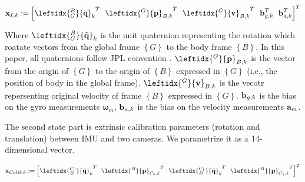 \documentclass[a4paper, 10pt, conference]{ieeeconf}      %
\begin{document}
\begin {equation}
\textbf x_{I,k} :=\left[  {\leftidx{_G^B}{\bar{\textbf q}}_k}^{ T} \ \
{\leftidx{^G}{\textbf p}_{B,k}}^T \ \
{\leftidx{^G}{\textbf v}_{B,k}}^T \ \
\textbf b_{g,k}^T\ \
\textbf b_{a,k}^T 
\right]^T 
\end{equation}



Where $  {\leftidx{_G^B}{\bar{\textbf q}}_k}  $ is the unit quaternion representing the rotation which roatate vectors 
from the global frame  $\left\lbrace G \right\rbrace$ to the body frame  $\left\lbrace B \right\rbrace$. In this paper, all quaternions follow JPL convention \cite{sola2012quaternion}. $ {\leftidx{^G}{\textbf p}_{B,k}} $ is the vector from the
origin of $\left\lbrace G \right\rbrace$ to the origin of $\left\lbrace B \right\rbrace$ expressed in $\left\lbrace G \right\rbrace$ (i.e., the position of body in the global frame). $ {\leftidx{^G}{\textbf v}_{B,k}} $ is the vecotr repersenting original velocity of  frame  $\left\lbrace B \right\rbrace$ expressed in  $\left\lbrace G \right\rbrace$. $ \textbf b_{g,k} $ is the
bias on the gyro measurements $  \bm{ \omega}_m  $, $ \textbf  b_{a,k} $ is the bias on the
velocity measurements $ \textbf a_m $.

The second state part is extrinsic calibration parameters (rotation and translation) between IMU and two cameras. We parametrize it as a 14-dimensional vector.

\begin {equation}
\textbf x_{Calib,k} :=\left[  {\leftidx{_B^{C_0}}{\bar{\textbf q}}_k}^{ T} \ \
{\leftidx{^B}{\textbf p}_{C_0,k}}^T \ \
{\leftidx{_B^{C_1}}{\bar{\textbf q}}_k}^{ T} \ \
{\leftidx{^B}{\textbf p}_{C_1,k}}^T 
\right]^T
\end{equation}
\end{document}
